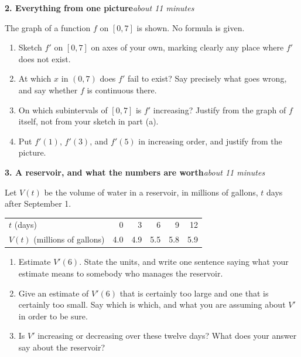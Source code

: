 \documentclass[11pt]{article}
\newcommand{\gridxy}[4]{%
  \foreach \gX in {#1,...,#2} \draw[gray!25] (\gX,#3) -- (\gX,#4);
  \foreach \gY in {#3,...,#4} \draw[gray!25] (#1,\gY) -- (#2,\gY);}
\newcommand{\prob}[2]{\medskip\noindent\textbf{\large #1}\hfill\textit{#2}\par\smallskip}
\begin{document}
\prob{2. Everything from one picture}{about 11 minutes}
The graph of a function $f$ on $[0,7]$ is shown. No formula is given.
\smallskip
\begin{center}
\end{center}
\begin{enumerate}
\item Sketch $f'$ on $[0,7]$ on axes of your own, marking clearly any place where $f'$
does not exist.
\item At which $x$ in $(0,7)$ does $f'$ fail to exist? Say precisely what goes wrong, and
say whether $f$ is continuous there.
\item On which subintervals of $[0,7]$ is $f'$ increasing? Justify from the graph of $f$
itself, not from your sketch in part (a).
\item Put $f'(1)$, $f'(3)$, and $f'(5)$ in increasing order, and justify from the picture.
\end{enumerate}

\newpage
\prob{3. A reservoir, and what the numbers are worth}{about 11 minutes}
Let $V(t)$ be the volume of water in a reservoir, in millions of gallons, $t$ days after
September 1.
\smallskip
\begin{center}
\begin{tabular}{@{}lrrrrr@{}}
\toprule
$t$ (days) & 0 & 3 & 6 & 9 & 12\\
$V(t)$ (millions of gallons) & 4.0 & 4.9 & 5.5 & 5.8 & 5.9\\
\bottomrule
\end{tabular}
\end{center}
\smallskip
\begin{enumerate}
\item Estimate $V'(6)$. State the units, and write one sentence saying what your estimate
means to somebody who manages the reservoir.
\item Give an estimate of $V'(6)$ that is certainly too large and one that is certainly
too small. Say which is which, and what you are assuming about $V'$ in order to be sure.
\item Is $V'$ increasing or decreasing over these twelve days? What does your answer say
about the reservoir?
\end{enumerate}
\end{document}
